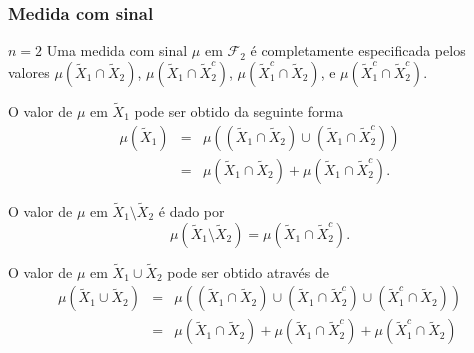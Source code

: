 \begin{frame}%
  \frametitle{Medida com sinal}
  \begin{exampleblock}{$n=2$}
  Uma medida com sinal $\mu$ em $\mathcal{F}_2$ é completamente especificada pelos
  valores 
  $\mu( \tilde{X}_1 \cap \tilde{X}_2 )$,
  $\mu( \tilde{X}_1 \cap \tilde{X}_2^c )$,
  $\mu( \tilde{X}_1^c \cap \tilde{X}_2 )$, e
  $\mu( \tilde{X}_1^c \cap \tilde{X}_2^c )$.

  O valor de $\mu$ em $\tilde{X}_1$ pode ser obtido da seguinte forma
  \begin{eqnarray}
  \mu( \tilde{X}_1 ) &=& \mu( (\tilde{X}_1 \cap \tilde{X}_2) \cup ( \tilde{X}_1 \cap \tilde{X}_2^c) ) \nonumber \\
		&=& \mu( \tilde{X}_1 \cap \tilde{X}_2 ) + \mu( \tilde{X}_1 \cap \tilde{X}_2^c ) .
  \end{eqnarray}

  O valor de $\mu$ em $\tilde{X}_1 \setminus \tilde{X}_2$ é dado por
  \begin{equation}
  \mu( \tilde{X}_1 \setminus \tilde{X}_2 ) = \mu( \tilde{X}_1 \cap \tilde{X}_2^c ) .
  \end{equation}

  O valor de $\mu$ em $\tilde{X}_1 \cup \tilde{X}_2$ pode ser obtido através de
  \begin{eqnarray}
  \mu( \tilde{X}_1 \cup \tilde{X}_2 ) &=& \mu( (\tilde{X}_1 \cap \tilde{X}_2) \cup (\tilde{X}_1 \cap \tilde{X}_2^c) \cup (\tilde{X}_1^c \cap \tilde{X}_2) ) \nonumber \\
	&=& \mu( \tilde{X}_1 \cap \tilde{X}_2 ) + \mu( \tilde{X}_1 \cap \tilde{X}_2^c ) + \mu(\tilde{X}_1^c \cap \tilde{X}_2) 
  \end{eqnarray}

  \end{exampleblock}
\end{frame}


